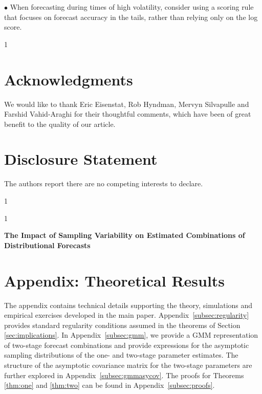 \documentclass[12pt]{article}
\newcommand{\blind}{1}
\theoremstyle{definition}
\theoremstyle{remark}
\renewcommand{\appendixname}{Appendix}
\begin{document}
\smallskip 

\noindent $\bullet$ When forecasting during times of high volatility, consider using a scoring rule that focuses on forecast accuracy in the tails, rather than relying only on the log score.

\blind
{
\section*{Acknowledgments}
We would like to thank Eric Eisenstat, Rob Hyndman, Mervyn Silvapulle and Farshid Vahid-Araghi for their thoughtful comments, which have been of great benefit to the quality of our article.

\section*{Disclosure Statement}
The authors report there are no competing interests to declare.
}\fi

{
\footnotesize


}

\newpage


\blind
{
  \setcounter{footnote}{0}
  \renewcommand{\thefootnote}{\fnsymbol{footnote}}
  \title{\papertitle}
  \author{\paperauthors}
  \maketitle
  \footnotetext[1]{\funding}
  \footnotetext[2]{\mddisclaimer}
  \renewcommand{\thefootnote}{\arabic{footnote}}
} \fi

\blind
{
  \bigskip
  \bigskip
  \bigskip
  \begin{center}
    {\LARGE\bf The Impact of Sampling Variability on Estimated Combinations of Distributional Forecasts}
\end{center}
  \medskip
} \fi

\appendix

\section*{\centering Appendix: Theoretical Results}
\setcounter{section}{1}

The appendix contains technical details supporting the theory, simulations and empirical exercises developed in the main paper. \appendixname\ \ref{subsec:regularity} provides standard regularity conditions assumed in the theorems of Section \ref{sec:implications}. In \appendixname\ \ref{subsec:gmm}, we provide a GMM representation of two-stage forecast combinations and provide expressions for the asymptotic sampling distributions of the one- and two-stage parameter estimates. The structure of the asymptotic covariance matrix for the two-stage parameters are further explored in \appendixname\ \ref{subsec:gmmasycov}. The proofs for Theorems \ref{thm:one} and \ref{thm:two} can be found in \appendixname\ \ref{subsec:proofs}.
\end{document}
